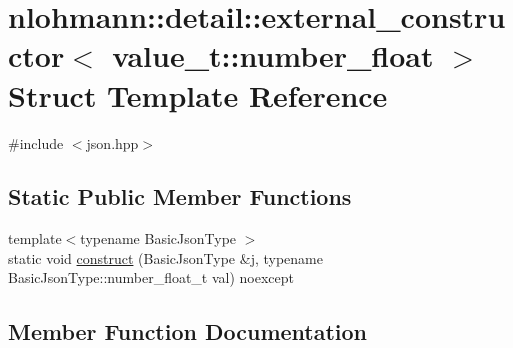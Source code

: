 \hypertarget{structnlohmann_1_1detail_1_1external__constructor_3_01value__t_1_1number__float_01_4}{}\section{nlohmann\+:\+:detail\+:\+:external\+\_\+constructor$<$ value\+\_\+t\+:\+:number\+\_\+float $>$ Struct Template Reference}
\label{structnlohmann_1_1detail_1_1external__constructor_3_01value__t_1_1number__float_01_4}


{\ttfamily \#include $<$json.\+hpp$>$}

\subsection*{Static Public Member Functions}
\begin{DoxyCompactItemize}
\item 
{\footnotesize template$<$typename Basic\+Json\+Type $>$ }\\static void \hyperlink{structnlohmann_1_1detail_1_1external__constructor_3_01value__t_1_1number__float_01_4_a669df5a4d258b588e67f747c6d656cdb}{construct} (Basic\+Json\+Type \&j, typename Basic\+Json\+Type\+::number\+\_\+float\+\_\+t val) noexcept
\end{DoxyCompactItemize}


\subsection{Member Function Documentation}
